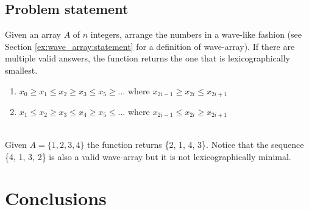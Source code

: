 \subsection{Problem statement}
\begin{exercise}
Given an array $A$ of $n$ integers, arrange the numbers in a wave-like fashion (see Section \ref{ex:wave_array:statement} for a definition of wave-array).
If there are multiple valid answers, the function returns the one that is lexicographically smallest.
	\begin{enumerate}
		\item  $x_0 \geq x_1 \leq x_2 \geq x_3 \leq  x_5 \geq \ldots$ where $x_{2i-1} \geq x_{2i} \leq x_{2i+1}$
		\item  $x_1 \leq x_2 \geq x_3 \leq x_4 \geq x_5 \leq \ldots$ where $x_{2i-1} \leq x_{2i} \geq x_{2i+1}$
	\end{enumerate}


	\begin{example}
		\hfill \\
		\label{ex:wave_array:var1:example1}
		Given $A=\{1, 2, 3, 4\}$ the function returns \{2, 1, 4, 3\}. Notice that the sequence \{4, 1, 3, 2\} is also a valid wave-array but it is not lexicographically minimal.
	\end{example}
\end{exercise}

\section{Conclusions}